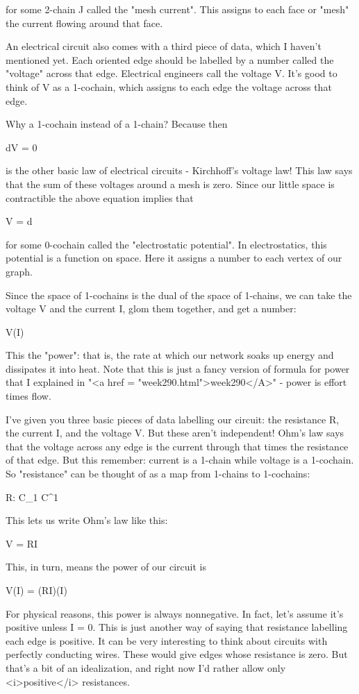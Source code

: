 for some 2-chain J called the "mesh current".  This assigns to each
face or "mesh" the current flowing around that face.

An electrical circuit also comes with a third piece of data, which I
haven't mentioned yet.  Each oriented edge should be labelled by a
number called the "voltage" across that edge.  Electrical engineers
call the voltage V.  It's good to think of V as a 1-cochain, which
assigns to each edge the voltage across that edge.  

Why a 1-cochain instead of a 1-chain?  Because then

dV = 0

is the other basic law of electrical circuits - Kirchhoff's voltage
law!  This law says that the sum of these voltages around a mesh is
zero.  Since our little space is contractible the above equation
implies that

V = d\phi 

for some 0-cochain \phi  called the "electrostatic potential".  In 
electrostatics, this potential is a function on space.  Here it
assigns a number to each vertex of our graph.  

Since the space of 1-cochains is the dual of the space of 1-chains, we
can take the voltage V and the current I, glom them together, and get
a number:

V(I)

This the "power": that is, the rate at which our network
soaks up energy and dissipates it into heat.  Note that this is just a
fancy version of formula for power that I explained in "<a href =
"week290.html">week290</A>" - power is effort times flow.

I've given you three basic pieces of data labelling our circuit: the
resistance R, the current I, and the voltage V.  But these aren't
independent!  Ohm's law says that the voltage across any edge is the
current through that times the resistance of that edge.  But this
remember: current is a 1-chain while voltage is a 1-cochain.  So
"resistance" can be thought of as a map from 1-chains to
1-cochains:

R: C_{1} \to  C^{1}

This lets us write Ohm's law like this:

V = RI

This, in turn, means the power of our circuit is

V(I) = (RI)(I)

For physical reasons, this power is always nonnegative.  In fact,
let's assume it's positive unless I = 0.  This is just another way of
saying that resistance labelling each edge is positive.  It can be
very interesting to think about circuits with perfectly conducting
wires.  These would give edges whose resistance is zero.  But that's a
bit of an idealization, and right now I'd rather allow only <i>positive</i>
resistances.

